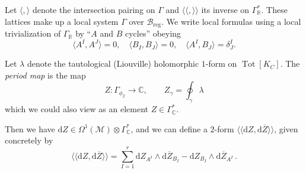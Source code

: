 \documentclass[12pt,letterpaper,reqno]{article}
\numberwithin{equation}{section}
\newcommand{\cB}{\ensuremath{\mathcal B}}
\newcommand{\cM}{\ensuremath{\mathcal M}}
\newcommand{\bbR}{\ensuremath{\mathbb R}}
\newcommand{\bbC}{\ensuremath{\mathbb C}}
\newcommand{\de}{\mathrm{d}}
\newcommand{\reg}{\mathrm{reg}}
\newcommand{\IP}[1]{\langle#1\rangle}
\newcommand{\DIP}[1]{\langle\!\langle#1\rangle\!\rangle}
\newcommand{\ti}[1]{\textit{#1}}
\DeclareMathOperator{\Tot}{Tot}
\begin{document}
Let $\IP{,}$ denote the intersection pairing on $\Gamma$
and $\DIP{,}$ its inverse on $\Gamma^*_\bbR$.
These lattices make up a local system $\Gamma$ over $\cB_\reg$.
We write local formulas using a local
trivialization of $\Gamma_\bbR$ by ``$A$ and $B$ cycles''
obeying
\begin{equation}
  \IP{A^I, A^J}=0, \quad \IP{B_I, B_J}=0, \quad \IP{A^I,B_J} = \delta^I_J.
\end{equation}

\begin{defn}
Let $\lambda$ denote the tautological (Liouville) holomorphic $1$-form
on $\Tot[K_C]$.
The \ti{period map} is the map
\begin{equation}
   Z: \Gamma_{\phi_2} \to \bbC, \qquad Z_\gamma = \oint_\gamma \lambda
\end{equation}
which we could also view as an element $Z \in \Gamma^*_\bbC$.
\end{defn}
Then we have $\de Z \in \Omega^1(\cM) \otimes \Gamma_\bbC^*$,
and we can define a $2$-form $\DIP{\de Z, \de \overline{Z}}$,
given concretely by
\begin{equation}
  \DIP{\de Z, \de \overline{Z}} = \sum_{I = 1}^{r} \de Z_{A^I} \wedge \de \overline{Z}_{B_I} - \de Z_{B_I} \wedge \de \overline{Z}_{A^I} \, .
\end{equation}


\end{document}
